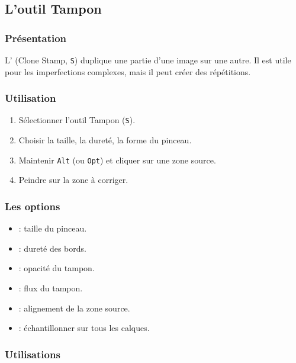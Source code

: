 \subsection{L'outil Tampon}

\subsubsection{Présentation}

L' (Clone Stamp, \texttt{S}) duplique une partie d'une image sur une autre. Il est utile pour les imperfections complexes, mais il peut créer des répétitions.

\subsubsection{Utilisation}

\begin{enumerate}
    \item Sélectionner l'outil Tampon (\texttt{S}).
    \item Choisir la taille, la dureté, la forme du pinceau.
    \item Maintenir \texttt{Alt} (ou \texttt{Opt}) et cliquer sur une zone source.
    \item Peindre sur la zone à corriger.
\end{enumerate}

\subsubsection{Les options}

\begin{itemize}
    \item {} : taille du pinceau.
    \item {} : dureté des bords.
    \item {} : opacité du tampon.
    \item {} : flux du tampon.
    \item {} : alignement de la zone source.
    \item {} : échantillonner sur tous les calques.
\end{itemize}

\subsubsection{Utilisations}

